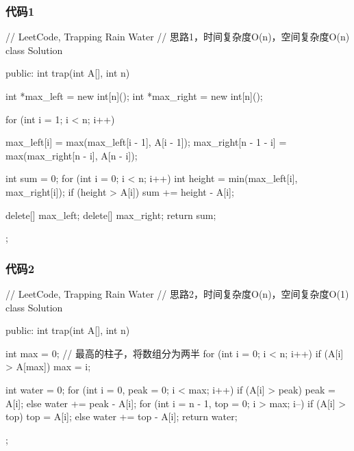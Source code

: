 \subsubsection{代码1}
\begin{Code}
// LeetCode, Trapping Rain Water
// 思路1，时间复杂度O(n)，空间复杂度O(n)
class Solution {
public:
    int trap(int A[], int n) {
        int *max_left = new int[n]();
        int *max_right = new int[n]();

        for (int i = 1; i < n; i++) {
            max_left[i] = max(max_left[i - 1], A[i - 1]);
            max_right[n - 1 - i] = max(max_right[n - i], A[n - i]);

        }

        int sum = 0;
        for (int i = 0; i < n; i++) {
            int height = min(max_left[i], max_right[i]);
            if (height > A[i]) {
                sum += height - A[i];
            }
        }

        delete[] max_left;
        delete[] max_right;
        return sum;
    }
};
\end{Code}


\subsubsection{代码2}
\begin{Code}
// LeetCode, Trapping Rain Water
// 思路2，时间复杂度O(n)，空间复杂度O(1)
class Solution {
public:
    int trap(int A[], int n) {
        int max = 0; // 最高的柱子，将数组分为两半
        for (int i = 0; i < n; i++)
            if (A[i] > A[max]) max = i;

        int water = 0;
        for (int i = 0, peak = 0; i < max; i++)
            if (A[i] > peak) peak = A[i];
            else water += peak - A[i];
        for (int i = n - 1, top = 0; i > max; i--)
            if (A[i] > top) top = A[i];
            else water += top - A[i];
        return water;
    }
};
\end{Code}


